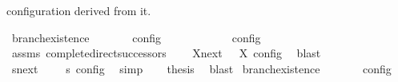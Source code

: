 \begin{isabellebody}
\begin{isamarkuptext}
  configuration derived from it.%
\end{isamarkuptext}\isamarkuptrue%
\isamarkupfalse%
\ branch{\isacharunderscore}existence{\isacharcolon}\isanewline
\ \ \ {\isacartoucheopen}{\isasymrho}\ {\isasymin}\ {\isasymlbrakk}\ {\isasymS}\ {\isasymrbrakk}\isactrlsub c\isactrlsub o\isactrlsub n\isactrlsub f\isactrlsub i\isactrlsub g{\isacartoucheclose}\isanewline
\ \ \ {\isacartoucheopen}{\isasymexists}{\isasymS}\ {\isacharparenleft}{\isasymS}\ {\isasymhookrightarrow}\ {\isasymS}\ {\isasymand}\ {\isacharparenleft}{\isasymrho}\ {\isasymin}\ {\isasymlbrakk}\ {\isasymS}\ {\isasymrbrakk}\isactrlsub c\isactrlsub o\isactrlsub n\isactrlsub f\isactrlsub i\isactrlsub g{\isacharparenright}{\isacartoucheclose}\isanewline
%
\isadelimproof
%
\endisadelimproof
%
\isatagproof
{}\isamarkupfalse%
\ {\isacharminus}\isanewline
\ \ \isamarkupfalse%
\ assms\ complete{\isacharunderscore}direct{\isacharunderscore}successors{\isacharprime}\ \isamarkupfalse%
\ {\isacartoucheopen}{\isasymrho}\ {\isasymin}\ {\isacharparenleft}{\isasymUnion}X{\isasymin}{\isasymC}\isactrlsub n\isactrlsub e\isactrlsub x\isactrlsub t\ {\isasymS}\ {\isasymlbrakk}\ X\ {\isasymrbrakk}\isactrlsub c\isactrlsub o\isactrlsub n\isactrlsub f\isactrlsub i\isactrlsub g{\isacharparenright}{\isacartoucheclose}\ \isamarkupfalse%
\ blast\isanewline
\ \ \isamarkupfalse%
\ {\isacartoucheopen}{\isasymexists}s{\isasymin}{\isasymC}\isactrlsub n\isactrlsub e\isactrlsub x\isactrlsub t\ {\isasymS}\ {\isasymrho}\ {\isasymin}\ {\isasymlbrakk}\ s\ {\isasymrbrakk}\isactrlsub c\isactrlsub o\isactrlsub n\isactrlsub f\isactrlsub i\isactrlsub g{\isacartoucheclose}\ \isamarkupfalse%
\ simp\isanewline
\ \ \isamarkupfalse%
\ {\isacharquery}thesis\ \isamarkupfalse%
\ blast\isanewline
{}\isamarkupfalse%
%
\endisatagproof
{\isafoldproof}%
%
\isadelimproof
\isanewline
%
\endisadelimproof
\isanewline
{}\isamarkupfalse%
\ branch{\isacharunderscore}existence{\isacharprime}{\isacharcolon}\isanewline
\ \ \ {\isacartoucheopen}{\isasymrho}\ {\isasymin}\ {\isasymlbrakk}\ {\isasymS}\ {\isasymrbrakk}\isactrlsub c\isactrlsub o\isactrlsub n\isactrlsub f\isactrlsub i\isactrlsub g{\isacartoucheclose}\isanewline

\end{isabellebody}
